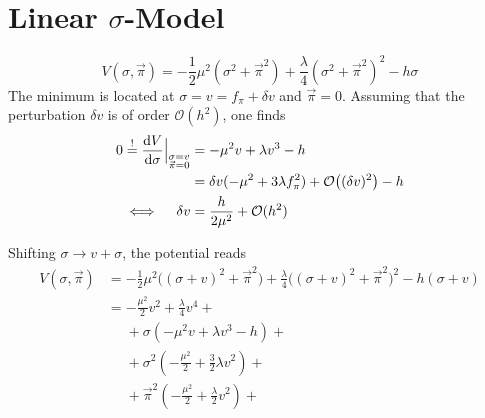 \section{Linear $\sigma$-Model}

\begin{equation}
V(\sigma,\vec{\pi})=-\frac{1}{2}\mu^2(\sigma^2+\vec{\pi}^2)+\frac{\lambda}{4}(\sigma^2+\vec{\pi}^2)^2-h\sigma
\end{equation}
The minimum is located at ${\sigma= v=f_\pi+\delta v}$ and ${\vec{\pi}=0}$. Assuming that the perturbation ${\delta v}$ is of order ${\mathcal{O}(h^2)}$, one finds
\begin{subequations}
    \begin{align}
        0\overset{!}{=}\frac{\text{d} V}{\text{d}\sigma}\Big\vert_{\substack{\sigma= v\\\vec{\pi}=0}}&=-\mu^2 v+\lambda v^3-h\\
        &=\delta v(-\mu^2+3\lambda f_\pi^2)+\mathcal{O}\big((\delta v)^2\big)-h\\
        \iff\quad\delta v&=\frac{h}{2\mu^2}+\mathcal{O}(h^2)
    \end{align}
\end{subequations}

Shifting ${\sigma\to v+\sigma}$, the potential reads
\begin{subequations}
    \begin{align}
        V(\sigma,\vec{\pi})&=-\frac{1}{2}\mu^2\big((\sigma+v)^2+\vec{\pi}^2\big)+\frac{\lambda}{4}\big((\sigma+v)^2+\vec{\pi}^2\big)^2-h(\sigma+v)\\
        &=-\frac{\mu^2}{2}v^2+\frac{\lambda}{4}v^4+\\
        &\phantom{=}+\sigma(-\mu^2v+\lambda v^3-h)+\\
        &\phantom{=}+\sigma^2(-\frac{\mu^2}{2}+\frac{3}{2}\lambda v^2)+\\
        &\phantom{=}+\vec{\pi}^2(-\frac{\mu^2}{2}+\frac{\lambda}{2}v^2)+
    \end{align}
\end{subequations}